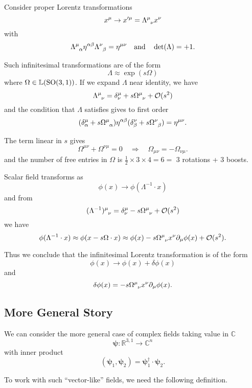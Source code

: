 \documentclass[a4paper,11pt]{article}
\begin{document}
	\begin{ex}
		Consider proper Lorentz transformations
		\[
			x^\mu \to x'^\mu = \LT{\mu}{\nu} x ^{\nu}
		\]
		with
		\[
			\LT{\mu}{\alpha} \eta ^{\alpha \beta} \LT{\nu}{\beta} = \eta ^{\mu \nu} \quad \text{and} \quad \det (\Lambda) = +1.
		\]
		
		Such infinitesimal transformations are of the form \[
			\Lambda \approx \exp(s \Omega)
		\]
		where $\Omega \in \mathbb{L}(\operatorname{SO}(3,1))$. If we expand $\Lambda$ near identity, we have
		\[
			\LT{\mu}{\nu} = \delta^\mu _\nu + s \Omega\indices{^{\mu}_{\nu}} + \mathcal{O}(s^2)
		\]
		and the condition that $\Lambda$ satisfies gives to first order
		\[
			(\delta^\mu_\alpha + s \Omega\indices{^\mu_\alpha})\eta ^{\alpha \beta} (\delta^\nu_\beta + s \Omega\indices{^\nu _\beta}) = \eta ^{\mu \nu}.
		\]
		
		The term linear in $s$ gives
		\[
			\Omega ^{\mu \nu} + \Omega ^{\nu \mu} = 0 \quad \Rightarrow \quad \Omega _{\mu \nu} = - \Omega _{\nu \mu}.
		\]
		and the number of free entries in $\Omega$ is $\frac{1}{2} \times 3 \times 4 = 6 =$ 3 rotations + 3 boosts.

		Scalar field transforms as
		\[
			\phi(x) \to \phi(\Lambda^{-1}\cdot x)
		\]
		and from
		\[
			(\Lambda^{-1})\indices{^\mu_\nu} = \delta^\mu_\nu - s \Omega\indices{^\mu_\nu} + \mathcal{O}(s^2)
		\]
		we have
		\[
			\phi(\Lambda^{-1} \cdot x) \approx \phi(x - s \Omega \cdot x) \approx \phi(x) - s \Omega\indices{^\mu_\nu} x^\nu \partial_\mu \phi(x) + \mathcal{O}(s^2).
		\]
		
		Thus we conclude that the infinitesimal Lorentz transformation is of the form
		\[
			\phi(x) \to \phi(x) + \delta \phi(x)
		\]
		and 
		\begin{equation}
			\delta \phi(x) = -s \Omega\indices{^\mu_\nu} x^\nu \partial_\mu \phi(x).
		\end{equation}
	\end{ex}

	\subsection{More General Story}

	We can consider the more general case of complex fields taking value in $\mathbb{C}$
	\[
		\bm{\psi}: \mathbb{R}^{3,1} \to \mathbb{C}^n
	\]
	with inner product
	\[
		(\bm{\psi}_1, \bm \psi_2) = \bm \psi_1^\dagger \cdot \bm \psi_2.
	\]
	
	To work with such ``vector-like'' fields, we need the following definition.
\end{document}

